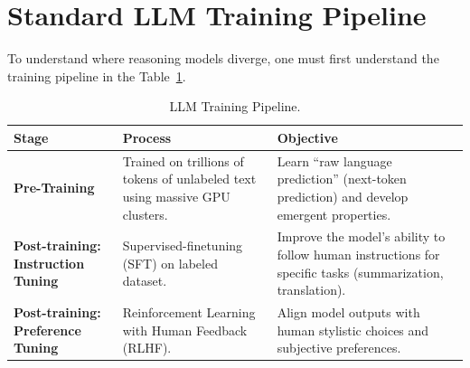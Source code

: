 ﻿\section{Standard LLM Training Pipeline}
\label{sec:standard-llm-training-pipeline}


To understand where reasoning models diverge, one must first understand the training pipeline in the Table~\ref{tab:llm-training-pipeline}.

\begin{table}[H]
  \centering
  \caption{LLM Training Pipeline.}
  \label{tab:llm-training-pipeline}
  \begin{tabularx}{\textwidth}{@{}>{\bfseries}p{} X X@{}}
    \toprule
    \normalfont\textbf{Stage} & \textbf{Process} & \textbf{Objective} \\
    \midrule
    Pre-Training & Trained on trillions of tokens of unlabeled text using massive GPU clusters. & Learn ``raw language prediction'' (next-token prediction) and develop emergent properties. \\
    \addlinespace
    Post-training: Instruction Tuning & Supervised-finetuning (SFT) on labeled dataset. & Improve the model's ability to follow human instructions for specific tasks (summarization, translation). \\
    \addlinespace
    Post-training: Preference Tuning & Reinforcement Learning with Human Feedback (RLHF). & Align model outputs with human stylistic choices and subjective preferences. \\
    \bottomrule
  \end{tabularx}
\end{table}